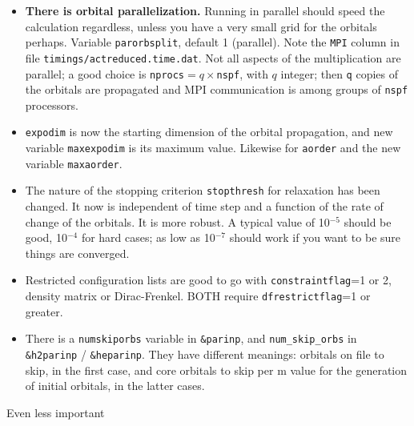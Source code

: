 \documentclass[10pt,leqno, oneside]{book}
\begin{document}
\begin{itemize}
%
\item{\textbf{There is orbital parallelization.}  Running in parallel should speed the calculation regardless, unless you have a very small grid for the orbitals perhaps.
Variable \verb#parorbsplit#, default 1 (parallel).  Note the \verb#MPI# column in file \verb#timings/actreduced.time.dat#.  Not all aspects of the multiplication are
parallel; a good choice is \verb#nprocs#$=q\times$\verb#nspf#, with $q$ integer; then \verb#q# copies of the orbitals are propagated and MPI communication is among groups of
\verb#nspf# processors.}
%
\item{\verb#expodim# is now the starting dimension of the orbital propagation, and new variable \verb#maxexpodim# is its maximum value.  Likewise for \verb#aorder# and the new variable \verb#maxaorder#.}
%
\item{The nature of the stopping criterion \verb#stopthresh# for relaxation has been changed.  It now is independent of time step and a function of the rate of change of the orbitals.  It is more robust.  A typical value of 10$^{-5}$ should be good, 10$^{-4}$ for hard cases; as low as 10$^{-7}$ should work if you want to be sure things are converged.}
%
\item{Restricted configuration lists are good to go with \verb#constraintflag#=1 or 2, density matrix or Dirac-Frenkel.  BOTH require \verb#dfrestrictflag#=1 or greater.}
%
\item{There is a \verb#numskiporbs# variable in \verb#&parinp#, and \verb#num_skip_orbs# in \verb#&h2parinp# / \verb#&heparinp#.  They have different meanings: 
orbitals on file to skip, in the first case, and core orbitals to skip per m value for the generation of initial orbitals, in the latter cases.}
\end{itemize}
%
Even less important
%
\end{document}

